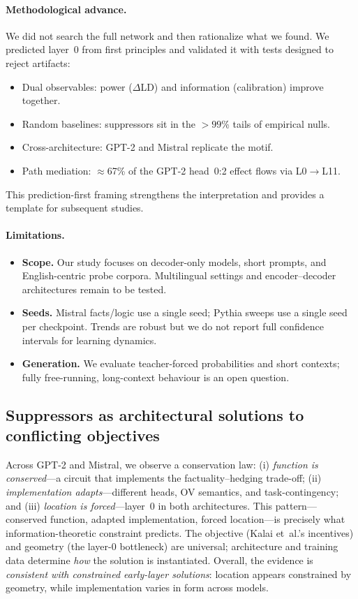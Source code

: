 \paragraph{Methodological advance.}
We did not search the full network and then rationalize what we found. We predicted layer~0 from first principles and validated it with tests designed to reject artifacts:
\begin{itemize}
    \item Dual observables: power ($\Delta$LD) and information (calibration) improve together.
    \item Random baselines: suppressors sit in the $>99$\% tails of empirical nulls.
    \item Cross-architecture: GPT-2 and Mistral replicate the motif.
    \item Path mediation: $\approx$67\% of the GPT-2 head~0:2 effect flows via L0$\rightarrow$L11.
\end{itemize}
This prediction-first framing strengthens the interpretation and provides a template for subsequent studies.

\paragraph{Limitations.}
\begin{itemize}
    \item \textbf{Scope.} Our study focuses on decoder-only models, short prompts, and English-centric probe corpora. Multilingual settings and encoder–decoder architectures remain to be tested.
    \item \textbf{Seeds.} Mistral facts/logic use a single seed; Pythia sweeps use a single seed per checkpoint. Trends are robust but we do not report full confidence intervals for learning dynamics.
    \item \textbf{Generation.} We evaluate teacher-forced probabilities and short contexts; fully free-running, long-context behaviour is an open question.
\end{itemize}

\subsection{Suppressors as architectural solutions to conflicting objectives}
Across GPT-2 and Mistral, we observe a conservation law: (i) \emph{function is conserved}—a circuit that implements the factuality–hedging trade-off; (ii) \emph{implementation adapts}—different heads, OV semantics, and task-contingency; and (iii) \emph{location is forced}—layer~0 in both architectures.
This pattern—conserved function, adapted implementation, forced location—is precisely what information-theoretic constraint predicts.
The objective (Kalai et~al.'s incentives) and geometry (the layer-0 bottleneck) are universal; architecture and training data determine \emph{how} the solution is instantiated.
Overall, the evidence is \emph{consistent with constrained early-layer solutions}: location appears constrained by geometry, while implementation varies in form across models.

